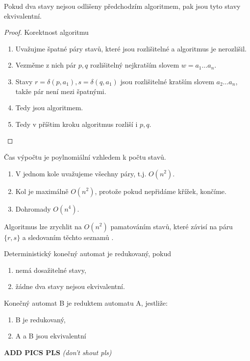 \documentclass[../main.tex]{subfiles}
\begin{document}
\begin{theorem}
    Pokud dva stavy nejsou odlišeny předchodzím algoritmem, pak jsou tyto stavy ekvivalentní.
\end{theorem}
\begin{proof}
    Korektnost algoritmu
    \begin{enumerate}
        \item Uvažujme špatné páry stavů, které jsou rozlišitelné a algoritmus je nerozlišil.
        \item Vezměme z nich pár $p,q$ rozlišitelný nejkratším slovem $w = a_1\dots a_n.$
        \item Stavy $r = \delta(p,a_1), s= \delta(q,a_1)$ jsou rozlišitelné kratším slovem 
        $a_2\dots a_n$, takže pár není mezi špatnými.
        \item Tedy jsou  algoritmem.
        \item Tedy v příštim kroku algoritmus rozliší i $p,q$.
    \end{enumerate}
\end{proof}

\begin{remark}
    Čas výpočtu je poylnomiální vzhledem k počtu stavů.

    \begin{enumerate}
        \item V jednom kole uvažujeme všechny páry, t.j. $O(n^2)$.
        \item Kol je maximálně $O(n^2)$, protože pokud nepřidáme křížek, končíme.
        \item Dohromady $O(n^4)$.
    \end{enumerate}
    Algoritmus lze zrychlit na $O(n^2)$ pamatováním stavů,
    které závisí na páru $\{r,s\}$ a sledovaním těchto seznamů .
\end{remark}

\begin{definition}
    Deterministický konečný automat je redukovaný, pokud
    \begin{enumerate}
        \item nemá dosažitelné stavy,
        \item žádne dva stavy nejsou ekvivalentní.
    \end{enumerate}
\end{definition}

\begin{definition}[Redukt]
    Konečný automat B je reduktem automatu A, jestliže:
    \begin{enumerate}
        \item B je redukovaný,
        \item A a B jsou ekvivalentní
    \end{enumerate}
    \textbf{ADD PICS PLS} \textit{(don't shout pls)}
\end{definition}
\end{document}
